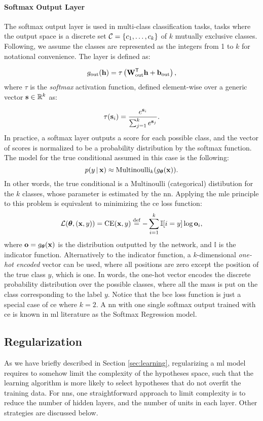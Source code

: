 \paragraph{Softmax Output Layer}
The softmax output layer is used in multi-class classification tasks, \ie tasks where the output space is a discrete set $\Cal{C} = \Set{c_1, \ldots, c_k}$ of $k$ mutually exclusive classes. Following, we assume the classes are represented as the integers from 1 to $k$ for notational convenience. The layer is defined as:

$$g_{\mathrm{out}}(\Vector{h}) = \tau \Paren{\Matrix{W}_{\mathrm{out}}^{\Transpose}\Vector{h} + \Vector{b}_{\mathrm{out}}},$$
where $\tau$ is the \emph{softmax} activation function, defined element-wise over a generic vector $\Vector{s} \in \Real^k$ as:

$$\tau(\Vector{s}_i) = \frac{e^{\Vector{s}_i}}{\sum_{j=1}^k e^{\Vector{s}_j}}.$$
In practice, a softmax layer outputs a score for each possible class, and the vector of scores is normalized to be a probability distribution by the softmax function. The model for the true conditional assumed in this case is the following:
$$p(y \given \Vector{x}) \approx \Fun{Multinoulli}_k(g_{\Param}(\Vector{x})).$$
In other words, the true conditional is a Multinoulli (categorical) distibution for the $k$ classes, whose parameter is estimated by the \gls{nn}. Applying the \gls{mle} principle to this problem is equivalent to minimizing the \gls{ce} loss function: 
$$\Loss(\Param, (\Vector{x}, y)) = \mathrm{CE}(\Vector{x}, y) \defeq - \sum_{i=1}^k \mathbb{I}[i=y] \log \Vector{o}_i,$$
where $\Vector{o} = g_{\Param}(\Vector{x})$ is the distribution outputted by the network, and $\mathbb{I}$ is the indicator function. Alternatively to the indicator function, a $k$-dimensional \emph{one-hot encoded} vector can be used, where all positions are zero except the position of the true class $y$, which is one. In words, the one-hot vector encodes the discrete probability distribution over the possible classes, where all the mass is put on the class corresponding to the label $y$. Notice that the \gls{bce} loss function is just a special case of \gls{ce} where $k = 2$. A \gls{nn} with one single softmax output trained with \gls{ce} is known in \gls{ml} literature as the Softmax Regression model.

\subsection{Regularization}\label{sec:regularization}
As we have briefly described in Section \ref{sec:learning}, regularizing a \gls{ml} model requires to somehow limit the complexity of the hypotheses space, such that the learning algorithm is more likely to select hypotheses that do not overfit the training data. For \glspl{nn}, one straightforward approach to limit complexity is to reduce the number of hidden layers, and the number of units in each layer. Other strategies are discussed below.

